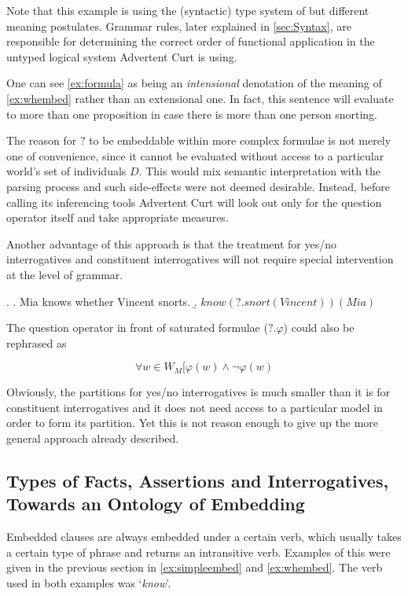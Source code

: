 \documentclass[notitlepage,twoside,a4paper]{scrreprt}
\newcommand{\pn}{\textsf} %
\newcommand{\example}[1]{`\textit{#1}'} %
\newcommand{\acurt}{\pn{Advertent Curt}}
\theoremstyle{remark}
\theoremstyle{remark}
\theoremstyle{definition}
\theoremstyle{definition}
\begin{document}
Note that this example is using  the (syntactic) type system of \cite{gs:sawhq}
but different meaning postulates. Grammar rules, later explained in
\ref{sec:Syntax}, are
responsible for determining the correct order of functional application in the
untyped logical system \acurt{} is using.

One can see \ref{ex:formula} as being an \emph{intensional} denotation of the
meaning of \ref{ex:whembed} rather than an extensional one. In fact, this
sentence will evaluate to more than one proposition in case there is more than one
person snorting.

The reason for $?$ to be embeddable within more complex formulae is not merely one
of convenience, since it cannot be evaluated without access to a particular
world's set of individuals $D$. This would mix semantic interpretation with
the parsing process and such side-effects were not deemed desirable.
Instead, before calling its inferencing tools \acurt{} will look out only for
the question operator itself and take appropriate measures.

Another advantage of this approach is that the treatment for yes/no
interrogatives and constituent interrogatives will not require special
intervention at the level of grammar.

\ex. \label{ex:simpleembed}
\a. Mia knows whether Vincent snorts.  \footnotesize
\b. $know(?.snort(Vincent))(Mia)$

The question operator in front of saturated formulae ($?.\varphi$) could also be
rephrased as

\[ \forall w\in W_M [ \varphi(w) \wedge \neg\varphi(w) \]

Obviously, the partitions for yes/no interrogatives is much smaller than it is
for constituent interrogatives and it does not need access to a particular model
in order to form its partition. Yet this is not reason enough to give up the
more general approach already described.

\subsection{Types of Facts, Assertions and Interrogatives, Towards an
Ontology of Embedding}\label{sec:ontology}

Embedded clauses are always embedded under a certain verb, which usually
takes a certain type of phrase and returns an intransitive verb. Examples of
this were given in the previous section in \ref{ex:simpleembed} and
\ref{ex:whembed}. The verb used in both examples was \example{know}.
\end{document}
